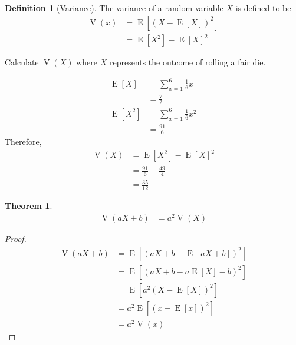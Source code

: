 \documentclass[titlepage, fleqn, a4paper, 12pt, twoside]{article}
\theoremstyle{definition}
\newtheorem{definition}{Definition}
\theoremstyle{theorem}
\newtheorem{theorem}{Theorem}
\DeclareMathOperator{\expct}{\mathrm{E}}
\DeclareMathOperator{\var}{\mathrm{V}}
\begin{document}
\begin{definition}[Variance]
	The variance of a random variable $X$ is defined to be
	\begin{align*}
		\var(x) & = \expct\left[ \left( X - \expct[X] \right)^2 \right] \\
                        & = \expct\left[ X^2 \right] - \expct[X]^2
	\end{align*}
\end{definition}

\begin{question}
	Calculate $\var(X)$ where $X$ represents the outcome of rolling a fair die.
\end{question}

\begin{solution}
	\begin{align*}
		\expct[X]                & = \sum\limits_{x = 1}^{6} \frac{1}{6} x   \\
                                         & = \frac{7}{2}                             \\
		\expct\left[ X^2 \right] & = \sum\limits_{x = 1}^{6} \frac{1}{6} x^2 \\
                                         & = \frac{91}{6}
	\end{align*}
	Therefore,
	\begin{align*}
		\var(X) & = \expct\left[ X^2 \right] - \expct[X]^2 \\
                        & = \frac{91}{6} - \frac{49}{4}            \\
                        & = \frac{35}{12}
	\end{align*}
\end{solution}

\begin{theorem}
	\begin{align*}
		\var(a X + b) & = a^2 \var(X)
	\end{align*}
\end{theorem}

\begin{proof}
	\begin{align*}
		\var(a X + b) & = \expct\left[ \left( a X + b - \expct[a X + b] \right)^2 \right] \\
                              & = \expct\left[ \left( a X + b - a \expct[X] - b \right)^2 \right] \\
                              & = \expct\left[ a^2 \left( X - \expct[X] \right)^2 \right]         \\
                              & = a^2 \expct\left[ \left( x - \expct[x] \right)^2 \right]         \\
                              & = a^2 \var(x)
	\end{align*}
\end{proof}
\end{document}
